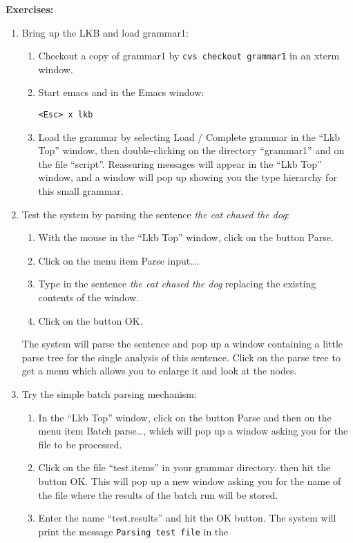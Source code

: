 \documentclass[10pt]{article}
\begin{document}
\smallskip
\textbf{Exercises:}
\begin{enumerate}
\item Bring up
the LKB and load grammar1:
\begin{enumerate}
\item Checkout a copy of grammar1 by {\tt cvs checkout grammar1} in 
an xterm window. 
\item Start emacs and in the Emacs window:
\par\texttt{<Esc> x lkb}
\item Load the grammar by selecting \textsf{Load / Complete
grammar} in the 
``Lkb Top'' window, then double-clicking on the directory ``grammar1'' and on the
file ``script''.  Reassuring messages will appear in the ``Lkb Top'' window,
and a window will pop up showing you the type hierarchy for this small
grammar.
\end{enumerate}
\item Test the system by parsing the sentence {\it the cat chased the dog}:
\begin{enumerate}
\item With the mouse in the ``Lkb Top'' window, click on the button
\textsf{Parse}. 
\item Click on the menu item \textsf{Parse input\ldots}.
\item Type in the sentence {\it the cat chased the dog} replacing
the existing contents of the window.
\item Click on the
button \textsf{OK}.
\end{enumerate}
The system will parse the sentence and pop up a window containing a little 
parse tree for the single analysis of this sentence.  Click on the parse
tree to get a menu which allows you to enlarge it and look at the nodes.
\item Try the simple batch parsing mechanism:
\begin{enumerate}
\item In the ``Lkb Top'' window, click on the button \textsf{Parse} and
then on the menu item \textsf{Batch parse\ldots}, which will pop up a window
asking you for the file to be processed.
\item Click on the file ``test.items'' in your grammar directory. then hit
the button \textsf{OK}.  This will pop up a new window asking you for the name
of the file where the results of the batch run will be stored.
\item Enter the name ``test.results'' and hit the \textsf{OK} button.
The system will print the message \texttt{Parsing test file} in the 

\end{enumerate}
\end{enumerate}
\end{document}
